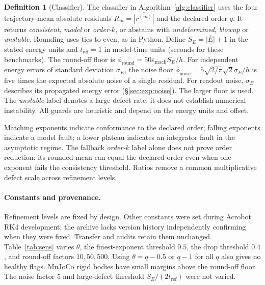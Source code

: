\documentclass[10pt]{article}
\theoremstyle{definition}
\newtheorem{definition}{Definition}
\begin{document}
\begin{definition}[Classifier]\label{def:classifier}
The classifier in Algorithm~\ref{alg:classifier} uses the four trajectory-mean
absolute residuals $R_m=\overline{|r^{(m)}|}$ and the declared order $q$.
It returns \emph{consistent}, \emph{model} or \emph{order-$k$}, or abstains
with \emph{undetermined}, \emph{blowup} or \emph{unstable}.
Rounding uses ties to even, as in Python. Define
$S_E=\overline{|E|}+1$ in the stated energy units and
$t_{\mathrm{ref}}=1$ in model-time units (seconds for these benchmarks).
The round-off floor is $\phi_{\mathrm{round}}=50\varepsilon_{\mathrm{mach}}S_E/h$.
For independent energy errors of standard deviation $\sigma_E$, the noise
floor $\phi_{\mathrm{noise}}=5\sqrt{2/\pi}\sqrt2\sigma_E/h$ is five times the
expected absolute noise of a single residual. For readout noise, $\sigma_E$
describes its propagated energy error (\S\ref{sec:exp:noise}). The larger
floor is used. The \emph{unstable} label denotes a large defect rate; it does
not establish numerical instability. All guards are heuristic and depend
on the energy units and offset.
\end{definition}

\begin{algorithm}[htbp]
\caption{Refinement-order classifier}\label{alg:classifier}
\centering

\end{algorithm}

Matching exponents indicate conformance to the declared order; falling
exponents indicate a model fault; a lower plateau indicates an integrator
fault in the asymptotic regime. The fallback \emph{order-$k$} label
alone does not prove order reduction: its rounded mean can equal the
declared order even when one exponent fails the consistency threshold.
Ratios remove a common multiplicative defect scale across refinement levels.

\paragraph{Constants and provenance.}\label{sec:constants}
Refinement levels are fixed by design. Other constants were set during Acrobot
RK4 development; the archive lacks version history independently confirming
when they were fixed. Transfer and audits retain them unchanged.
Table~\ref{tab:sens} varies $\theta$, the finest-exponent threshold $0.5$,
the drop threshold $0.4$, and round-off factors $10,50,500$. Using
$\theta=q-0.5$ or $q-1$ for all $q$ also gives no healthy flags. MuJoCo
rigid bodies have small margins above the round-off floor. The noise factor
$5$ and large-defect threshold $S_E/(2t_{\mathrm{ref}})$ were not varied.
\end{document}
